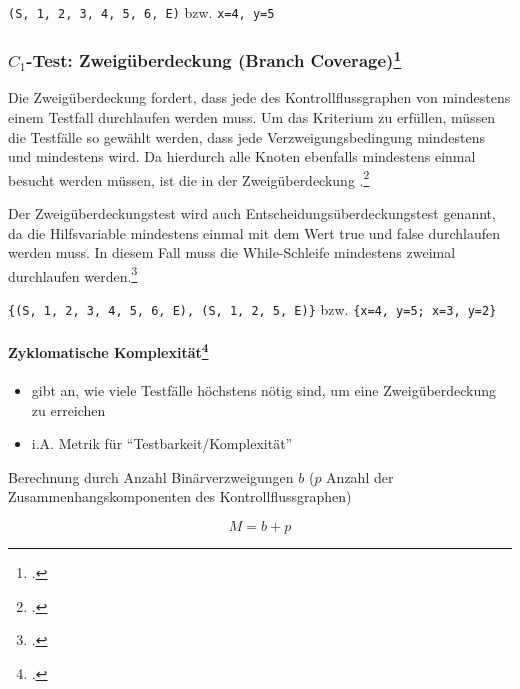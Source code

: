 \documentclass{lehramt-informatik-haupt}
\begin{document}
\texttt{(S, 1, 2, 3, 4, 5, 6, E)}
bzw.
\texttt{x=4, y=5}

%

\subsubsection{$C_1$-Test: Zweigüberdeckung (Branch Coverage)\footcite[Seite 37]{sosy:fs:5}}

Die Zweigüberdeckung fordert, dass jede  des
Kontrollflussgraphen von mindestens einem Testfall durchlaufen werden
muss. Um das Kriterium zu erfüllen, müssen die Testfälle so gewählt
werden, dass jede Verzweigungsbedingung mindestens 
und mindestens  wird. Da hierdurch alle Knoten
ebenfalls mindestens einmal besucht werden müssen, ist die
 in der Zweigüberdeckung .\footcite[Seite 209]{hoffmann}

Der Zweigüberdeckungstest wird auch Entscheidungsüberdeckungstest
genannt, da die Hilfsvariable mindestens einmal mit dem Wert true und
false durchlaufen werden muss. In diesem Fall muss die While-Schleife
mindestens zweimal durchlaufen werden.\footcite{wiki:kontrollfluss-test}


\texttt{\{(S, 1, 2, 3, 4, 5, 6, E), (S, 1, 2, 5, E)\}}
bzw.
\texttt{\{x=4, y=5; x=3, y=2\}}

%

\paragraph{Zyklomatische Komplexität\footcite[Seite 38]{sosy:fs:5}}

\begin{itemize}
\item gibt an, wie viele Testfälle höchstens nötig sind, um eine
Zweigüberdeckung zu erreichen

\item i.A. Metrik für “Testbarkeit/Komplexität”
\end{itemize}

\noindent
Berechnung durch Anzahl Binärverzweigungen $b$ ($p$ Anzahl der
Zusammenhangskomponenten des Kontrollflussgraphen)

\begin{displaymath}
M = b + p
\end{displaymath}
\end{document}

